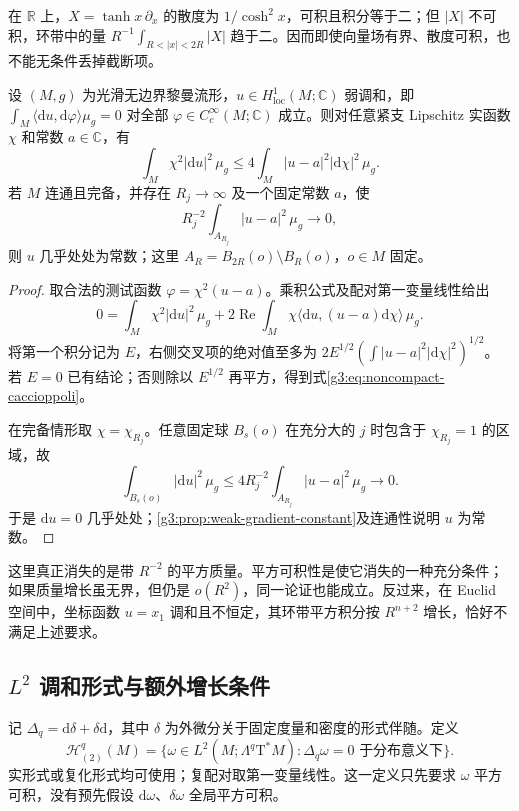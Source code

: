 在 \(\mathbb R\) 上，\(X=\tanh x\,\partial_x\) 的散度为 \(1/\cosh^2x\)，可积且积分等于二；但 \(|X|\) 不可积，环带中的量 \(R^{-1}\int_{R<|x|<2R}|X|\) 趋于二。因而即使向量场有界、散度可积，也不能无条件丢掉截断项。

\begin{proposition}\label{g3:prop:complete-harmonic-caccioppoli}
	设 \((M,g)\) 为光滑无边界黎曼流形，\(u\in H^1_{\mathrm{loc}}(M;\mathbb C)\) 弱调和，即
	\(\int_M\langle\mathrm du,\mathrm d\varphi\rangle\mu_g=0\) 对全部 \(\varphi\in C_c^\infty(M;\mathbb C)\) 成立。则对任意紧支 Lipschitz 实函数 \(\chi\) 和常数 \(a\in\mathbb C\)，有
	\begin{equation}\label{g3:eq:noncompact-caccioppoli}
		\int_M\chi^2|\mathrm du|^2\,\mu_g
		\le4\int_M|u-a|^2|\mathrm d\chi|^2\,\mu_g.
	\end{equation}
	若 \(M\) 连通且完备，并存在 \(R_j\to\infty\) 及一个固定常数 \(a\)，使
	\[
		R_j^{-2}\int_{A_{R_j}}|u-a|^2\,\mu_g\longrightarrow0,
	\]
	则 \(u\) 几乎处处为常数；这里 \(A_R=B_{2R}(o)\setminus B_R(o)\)，\(o\in M\) 固定。
\end{proposition}
\begin{proof}
	取合法的测试函数 \(\varphi=\chi^2(u-a)\)。乘积公式及配对第一变量线性给出
	\[
		0=\int_M\chi^2|\mathrm du|^2\,\mu_g
		+2\operatorname{Re}\int_M
		\chi\langle\mathrm du,(u-a)\mathrm d\chi\rangle\,\mu_g.
	\]
	将第一个积分记为 \(E\)，右侧交叉项的绝对值至多为
	\(2E^{1/2}(\int|u-a|^2|\mathrm d\chi|^2)^{1/2}\)。若 \(E=0\) 已有结论；否则除以 \(E^{1/2}\) 再平方，得到式\eqref{g3:eq:noncompact-caccioppoli}。

	在完备情形取 \(\chi=\chi_{R_j}\)。任意固定球 \(B_s(o)\) 在充分大的 \(j\) 时包含于 \(\chi_{R_j}=1\) 的区域，故
	\[
		\int_{B_s(o)}|\mathrm du|^2\,\mu_g
		\le4R_j^{-2}\int_{A_{R_j}}|u-a|^2\,\mu_g\longrightarrow0.
	\]
	于是 \(\mathrm du=0\) 几乎处处；\cref{g3:prop:weak-gradient-constant}及连通性说明 \(u\) 为常数。
\end{proof}

这里真正消失的是带 \(R^{-2}\) 的平方质量。平方可积性是使它消失的一种充分条件；如果质量增长虽无界，但仍是 \(o(R^2)\)，同一论证也能成立。反过来，在 Euclid 空间中，坐标函数 \(u=x_1\) 调和且不恒定，其环带平方积分按 \(R^{n+2}\) 增长，恰好不满足上述要求。

\subsection{\texorpdfstring{\(L^2\) 调和形式与额外增长条件}{L² 调和形式与额外增长条件}}
\label{g3:subsec:1504:03}
记 \(\Delta_q=\mathrm d\delta+\delta\mathrm d\)，其中 \(\delta\) 为外微分关于固定度量和密度的形式伴随。定义
\[
	\mathcal H_{(2)}^q(M)=
	\{\omega\in L^2(M;\Lambda^q\mathrm T^*M):
	\Delta_q\omega=0\text{ 于分布意义下}\}.
\]
实形式或复化形式均可使用；复配对取第一变量线性。这一定义只先要求 \(\omega\) 平方可积，没有预先假设 \(\mathrm d\omega\)、\(\delta\omega\) 全局平方可积。

